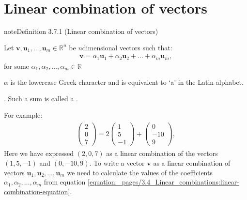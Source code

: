 \documentclass[letterpaper,10pt,english]{jupyterBook}
\begin{document}
\sphinxstepscope


\section{Linear combination of vectors}
\label{\detokenize{_pages/3.4_Linear_combinations:linear-combination-of-vectors}}\label{\detokenize{_pages/3.4_Linear_combinations:linear-combination-of-vectors-section}}\label{\detokenize{_pages/3.4_Linear_combinations::doc}}
\ignorespaces \label{_pages/3.4_Linear_combinations:linear-combination-of-vectors-definition}
\begin{sphinxadmonition}{note}{Definition 3.7.1 (Linear combination of vectors)}



\sphinxAtStartPar
Let \(\mathbf{v},\mathbf{u}_1,\dots,\mathbf{u}_m\in\mathbb{R}^n\) be \(n\)\sphinxhyphen{}dimensional vectors such that:
\begin{equation}\label{equation:_pages/3.4_Linear_combinations:linear-combination-equation}
\begin{split} \mathbf{v}=\alpha_1\mathbf{u}_1+\alpha_2\mathbf{u}_2+\dots+\alpha_m\mathbf{u}_m, \end{split}
\end{equation}
\sphinxAtStartPar
for some \(\alpha_1,\alpha_2,\dots,\alpha_m\in \mathbb{R}\) %
\begin{footnote}[1]\sphinxAtStartFootnote
\(\alpha\) is the lowercase Greek character  and is equivalent to ‘a’ in the Latin alphabet.
%
\end{footnote}. Such a sum is called a .
\end{sphinxadmonition}

\sphinxAtStartPar
For example:
\begin{equation*}
\begin{split} \begin{align*}
    \begin{pmatrix} 2 \\ 0 \\ 7 \end{pmatrix} =
    2\begin{pmatrix} 1 \\ 5 \\ -1 \end{pmatrix} +
    \begin{pmatrix} 0 \\ -10 \\ 9 \end{pmatrix},
\end{align*} \end{split}
\end{equation*}
\sphinxAtStartPar
Here we have expressed \((2,0,7)\) as a linear combination of the vectors \((1,5,-1)\) and \((0,-10,9)\). To write a vector \(\mathbf{v}\) as a linear combination of vectors \(\mathbf{u}_1, \mathbf{u}_2, \ldots, \mathbf{u}_m\) we need to calculate the values of the coefficients \(\alpha_1, \alpha_2, \ldots, \alpha_m\) from equation \eqref{equation:_pages/3.4_Linear_combinations:linear-combination-equation}.
\end{document}
